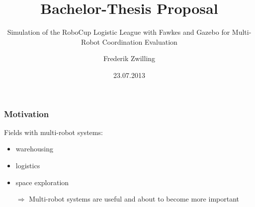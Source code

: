 \documentclass[]{beamer}
\title{Bachelor-Thesis Proposal}
\subtitle{Simulation of the RoboCup Logistic League with Fawkes and Gazebo for Multi-Robot Coordination Evaluation}
\author {Frederik Zwilling}
\institute{RWTH Aachen}
\date{23.07.2013}
\begin{document}
\frame{\titlepage}


\begin{frame}
\frametitle{Motivation}
\begin{multicols}{2}
\begin{figure}
\end{figure}
Fields with multi-robot systems:
\begin{itemize}
\item<1-> warehousing
\item<2-> logistics
\item<3-> space exploration
\end{itemize}
\end{multicols}
\pause \pause \pause 
\begin{itemize}
\item[$\Rightarrow$] Multi-robot systems are useful and about to become more important
\end{itemize}
\end{frame}
\end{document}
